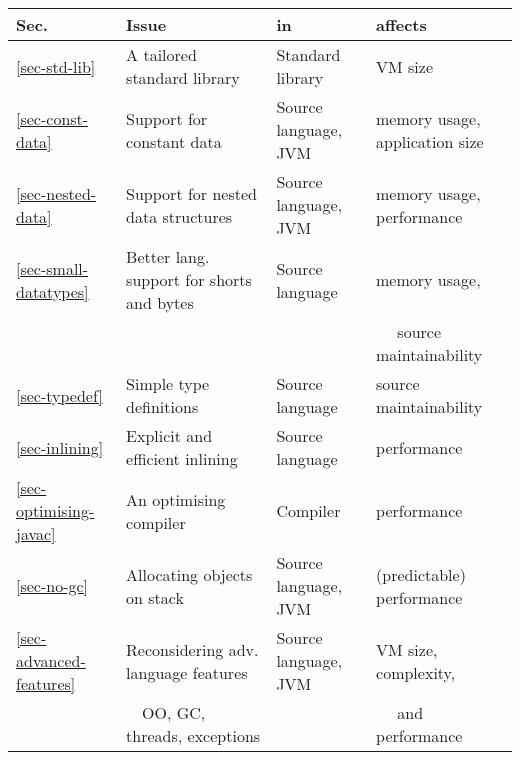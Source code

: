 \begin{tabular}{l|l|l|l}
\hline
\bfseries Sec.              & \bfseries Issue                               & \bfseries in          & \bfseries affects \\
\hline\hline
\ref{sec-std-lib}           & A tailored standard library                   & Standard library      & VM size \\
\ref{sec-const-data}        & Support for constant data                     & Source language, JVM  & memory usage, application size \\
\ref{sec-nested-data}       & Support for nested data structures            & Source language, JVM  & memory usage, performance \\
\ref{sec-small-datatypes}   & Better lang. support for shorts and bytes     & Source language       & memory usage, \\
                            &                                               &                       & ~~  source maintainability\\
\ref{sec-typedef}           & Simple type definitions                       & Source language       & source maintainability \\
\ref{sec-inlining}          & Explicit and efficient inlining               & Source language       & performance \\
\ref{sec-optimising-javac}  & An optimising compiler                        & Compiler              & performance \\
\ref{sec-no-gc}             & Allocating objects on stack                   & Source language, JVM  & (predictable) performance \\
\ref{sec-advanced-features} & Reconsidering adv. language features          & Source language, JVM  & VM size, complexity, \\
                            & ~~OO, GC, threads, exceptions                 &                       & ~~ and performance \\
\hline
\end{tabular}
